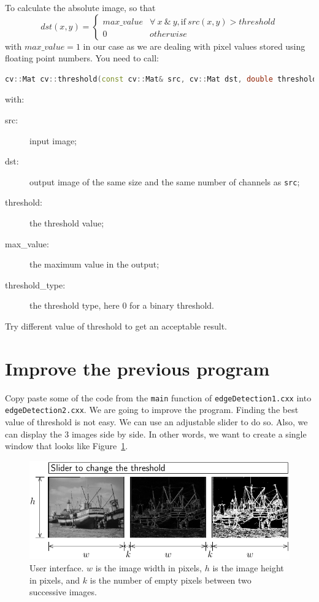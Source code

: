 \documentclass[english,a4paper,12pt,oneside]{article}
\begin{document}
To calculate the absolute image, so that
$$
dst(x,y)=
\left\lbrace	\begin{array}{ll}
		max\_value & \forall~x~\&~y, \mathrm{if}~src(x,y) > threshold\\
		0 & otherwise
	\end{array}
	\right.
$$
with $max\_value = 1$ in our case as we are dealing with pixel values stored using floating point numbers. 
You need to call:
 \begin{lstlisting}[language=c++]
 cv::Mat cv::threshold(const cv::Mat& src, cv::Mat dst, double threshold, double max_value, int threshold_type)
\end{lstlisting}
with:
\begin{description}
 \item[src:] input image;
 \item[dst:] output image of the same size and the same number of channels as \verb+src+;
 \item[threshold:] the threshold value;
 \item[max\_value:] the maximum value in the output;
 \item[threshold\_type:] the threshold type, here 0 for a binary threshold.
\end{description}

Try different value of threshold to get an acceptable result.



\section{Improve the previous program}

Copy paste some of the code from the \verb+main+ function of \verb+edgeDetection1.cxx+ into \verb+edgeDetection2.cxx+. 
We are going to improve the program. 
Finding the best value of threshold is not easy. 
We can use an adjustable slider to do so. 
Also, we can display the 3 images side by side. 
In other words, we want to create a single window that looks like Figure~\ref{fig:window}. 
\begin{figure}[htbp]
 \centering
 \includegraphics{display}
 \caption{\label{fig:window}User interface. $w$ is the image width in pixels, $h$ is the image height in pixels, and $k$ is the number of empty pixels between two successive images.}
\end{figure}
\end{document}
